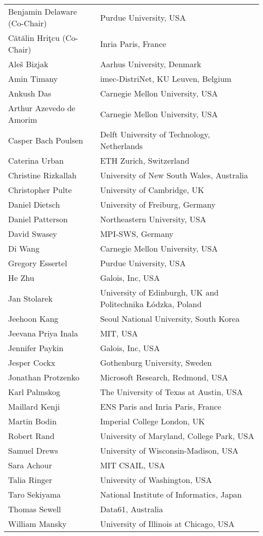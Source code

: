 \begin{tabular}{@{}p{\namewidth}l@{}}
Benjamin Delaware (Co-Chair)
  & Purdue University, USA\\
C\u{a}t\u{a}lin Hri\c{t}cu (Co-Chair)
  & Inria Paris, France \\
Aleš Bizjak
  & Aarhus University, Denmark\\
Amin Timany
  & imec-DistriNet, KU Leuven, Belgium\\
Ankush Das
  & Carnegie Mellon University, USA\\
Arthur Azevedo de Amorim
  & Carnegie Mellon University, USA\\
Casper Bach Poulsen
  & Delft University of Technology, Netherlands\\
Caterina Urban
  & ETH Zurich, Switzerland\\
Christine Rizkallah
  & University of New South Wales, Australia\\
Christopher Pulte
  & University of Cambridge, UK\\
Daniel Dietsch
  & University of Freiburg, Germany\\
Daniel Patterson
  & Northeastern University, USA\\
David Swasey
  & MPI-SWS, Germany\\
Di Wang
  & Carnegie Mellon University, USA\\
Gregory Essertel
  & Purdue University, USA\\
He Zhu
  & Galois, Inc, USA\\
Jan Stolarek
  & University of Edinburgh, UK and Politechnika Łódzka, Poland\\
Jeehoon Kang
  & Seoul National University, South Korea\\
Jeevana Priya Inala
  & MIT, USA\\
Jennifer Paykin
  & Galois, Inc, USA\\
Jesper Cockx
  & Gothenburg University, Sweden\\
Jonathan Protzenko
  & Microsoft Research, Redmond, USA\\
Karl Palmskog
  & The University of Texas at Austin, USA\\
Maillard Kenji
  & ENS Paris and Inria Paris, France\\
Martin Bodin
  & Imperial College London, UK\\
Robert Rand
  & University of Maryland, College Park, USA\\
Samuel Drews
  & University of Wisconsin-Madison, USA\\
Sara Achour
  & MIT CSAIL, USA\\
Talia Ringer
  & University of Washington, USA\\
Taro Sekiyama
  & National Institute of Informatics, Japan\\
Thomas Sewell
  & Data61, Australia\\
William Mansky
  & University of Illinois at Chicago, USA
\end{tabular}


\newpage
